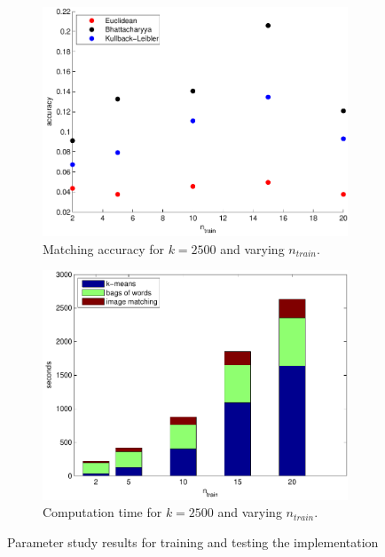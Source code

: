 \documentclass[11pt,a4paper]{article}
\begin{document}
\begin{figure}[H]
\begin{subfigure}[t]{0.48\textwidth}
        \includegraphics[width=\textwidth]{images/results_n_train.pdf}
        \caption{Matching accuracy for $k = 2500$ and varying $n_{train}$.}
        \label{fig:results_n_train}
    \end{subfigure}
    \begin{subfigure}[t]{0.48\textwidth}
        \includegraphics[width=\textwidth]{images/results_n_train_time.pdf}
        \caption{Computation time for $k = 2500$ and varying $n_{train}$.}
        \label{fig:results_n_train_time}
    \end{subfigure}
    \caption{Parameter study results for training and testing the
    implementation}
    \label{fig:parameter_results}
\end{figure}
\end{document}
